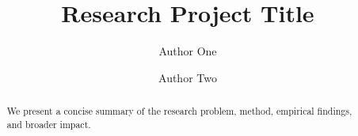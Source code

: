 \documentclass[11pt]{article}
\title{Research Project Title}
\author{Author One \and Author Two}
\date{}
\begin{document}
\maketitle

\begin{abstract}
We present a concise summary of the research problem, method, empirical findings, and broader
impact.
\end{abstract}








\end{document}
